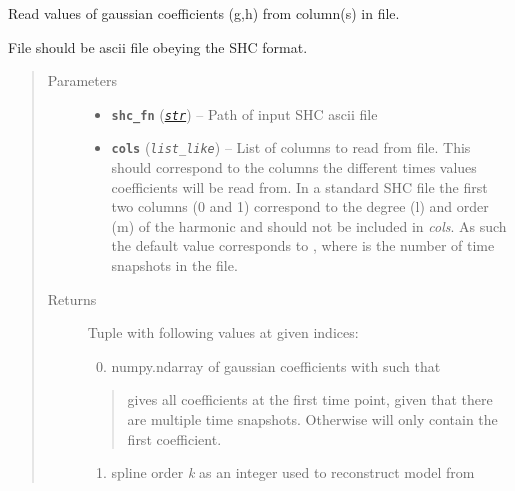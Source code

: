\documentclass[letterpaper,10pt,english]{sphinxhowto}
\begin{document}
\begin{fulllineitems}
\label{swtools_doc:swtools.read_shc}
Read values of gaussian coefficients (g,h) from column(s) in file.

File should be ascii file obeying the SHC format.
\begin{quote}\begin{description}
\item[{Parameters}] \leavevmode\begin{itemize}
\item {} 
\textbf{\texttt{shc\_fn}} (\href{https://docs.python.org/library/functions.html\#str}{\emph{\texttt{str}}}) -- Path of input SHC ascii file

\item {} 
\textbf{\texttt{cols}} (\emph{\texttt{list\_like}}) -- List of columns to read from file. This should correspond to the
columns the different times values coefficients will be
read from. In a standard SHC file the first two columns (0 and 1)
correspond to the degree (l) and order (m) of the harmonic and
should not be included in \emph{cols}. As such the default value
 corresponds to , where
 is the number of time snapshots in the file.

\end{itemize}

\item[{Returns}] \leavevmode

Tuple with following values at given indices:
\begin{enumerate}
\setcounter{enumi}{-1}
\item {} 
numpy.ndarray of gaussian coefficients with such that

\end{enumerate}
\begin{quote}

 gives all coefficients at the first time point,
given that there are multiple time snapshots. Otherwise
 will only contain the first coefficient.
\end{quote}
\begin{enumerate}
\item {} 
spline order \emph{k} as an integer used to reconstruct model from

\end{enumerate}
\begin{quote}


\end{quote}
\end{description}
\end{quote}
\end{fulllineitems}
\end{document}
